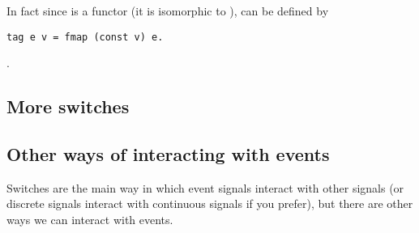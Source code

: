 \noindent In fact since  is a functor (it is isomorphic to ),  can be defined by

\begin{lstlisting}
tag e v = fmap (const v) e.
\end{lstlisting}.


\subsection{More switches}

\subsection{Other ways of interacting with events}
Switches are the main way in which event signals interact with other signals (or discrete signals interact with continuous signals if you prefer), but there are other ways we can interact with events.
